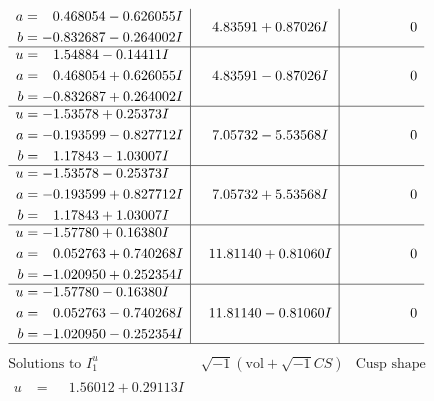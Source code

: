 \documentclass[1p]{elsarticle_modified}
\theoremstyle{definition}
\newcommand{\I}{\sqrt{-1}}
\begin{document}
$$\begin{array}{c|c|c}
\begin{aligned}
a &= \phantom{-}0.468054 - 0.626055 I \\
b &= -0.832687 - 0.264002 I\end{aligned}
 & \phantom{-}4.83591 + 0.87026 I & \phantom{-0.000000 } 0 \\ \hline\begin{aligned}
u &= \phantom{-}1.54884 - 0.14411 I \\
a &= \phantom{-}0.468054 + 0.626055 I \\
b &= -0.832687 + 0.264002 I\end{aligned}
 & \phantom{-}4.83591 - 0.87026 I & \phantom{-0.000000 } 0 \\ \hline\begin{aligned}
u &= -1.53578 + 0.25373 I \\
a &= -0.193599 - 0.827712 I \\
b &= \phantom{-}1.17843 - 1.03007 I\end{aligned}
 & \phantom{-}7.05732 - 5.53568 I & \phantom{-0.000000 } 0 \\ \hline\begin{aligned}
u &= -1.53578 - 0.25373 I \\
a &= -0.193599 + 0.827712 I \\
b &= \phantom{-}1.17843 + 1.03007 I\end{aligned}
 & \phantom{-}7.05732 + 5.53568 I & \phantom{-0.000000 } 0 \\ \hline\begin{aligned}
u &= -1.57780 + 0.16380 I \\
a &= \phantom{-}0.052763 + 0.740268 I \\
b &= -1.020950 + 0.252354 I\end{aligned}
 & \phantom{-}11.81140 + 0.81060 I & \phantom{-0.000000 } 0 \\ \hline\begin{aligned}
u &= -1.57780 - 0.16380 I \\
a &= \phantom{-}0.052763 - 0.740268 I \\
b &= -1.020950 - 0.252354 I\end{aligned}
 & \phantom{-}11.81140 - 0.81060 I & \phantom{-0.000000 } 0\\
 \hline 
 \end{array}$$\newpage$$\begin{array}{c|c|c}  
\text{Solutions to }I^u_{1}& \I (\text{vol} + \sqrt{-1}CS) & \text{Cusp shape}\\
 \hline 
\begin{aligned}
u &= \phantom{-}1.56012 + 0.29113 I \\

\end{aligned}
\end{array}$$
\end{document}

